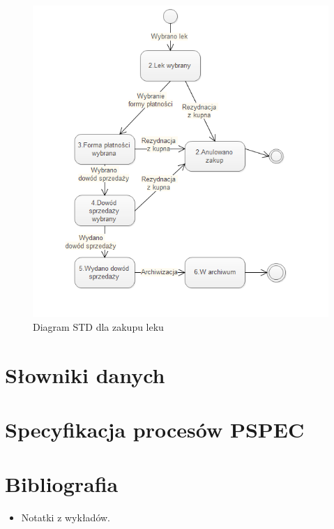 \documentclass[a4paper, 11pt]{article}
\begin{document}
	\begin{figure}[H]
\centerline{\includegraphics[scale=1]{STDzakup.png}}
\caption{Diagram STD dla zakupu leku}
\end{figure}
	\section{Słowniki danych}
	\section{Specyfikacja procesów PSPEC}
	
	
	\section{Bibliografia}
	\begin{itemize}
	\item Notatki z wykładów.
	\end{itemize}
	
\end{document}
